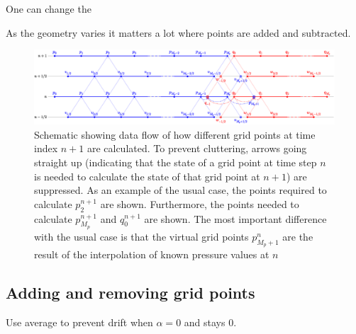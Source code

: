 One can change the 


As the geometry varies it matters a lot where points are added and subtracted. 

\begin{figure}[t]
    \centering
    \includegraphics[width = \textwidth]{Figures/tromboneSchematic.eps}
    \caption{Schematic showing data flow of how different grid points at time index $n+1$ are calculated. To prevent cluttering, arrows going straight up (indicating that the state of a grid point at time step $n$ is needed to calculate the state of that grid point at $n+1$) are suppressed. As an example of the usual case, the points required to calculate $p_2^{n+1}$ are shown. Furthermore, the points needed to calculate $p_{M_p}^{n+1}$ and $q_0^{n+1}$ are shown. The most important difference with the usual case is that the virtual grid points $p_{M_p+1}^n$ %
    are the result of the interpolation of known pressure values at $n$ %
    \label{fig:dynamicGridSchematic}}
\end{figure}


\subsection{Adding and removing grid points}
Use average to prevent drift when $\alpha = 0$ and stays 0.